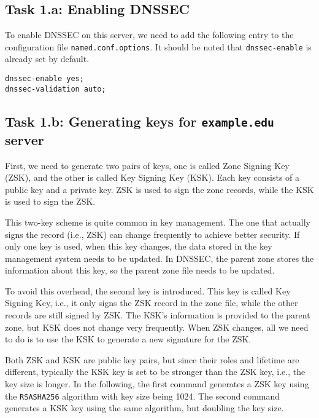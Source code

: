 \subsection{Task 1.a: Enabling DNSSEC}

To enable DNSSEC on this server, we need to add the following entry to the 
configuration file \texttt{named.conf.options}. 
It should be noted that \texttt{dnssec-enable} is already set by default. 

\begin{lstlisting}
dnssec-enable yes;
dnssec-validation auto;
\end{lstlisting}



\subsection{Task 1.b: Generating keys for \texttt{example.edu} server} 

First, we need to generate two pairs of keys, one is called Zone Signing Key (ZSK), and 
the other is called Key Signing Key (KSK). Each key consists of a public key and a private key.
ZSK is used to sign the zone records, while the KSK is used to sign the ZSK. 

This two-key scheme is quite common in key management. The one that actually signs the record
(i.e., ZSK) can change frequently to achieve better security. If only one key is used,
when this key changes, the data stored in the key management system needs to be updated. 
In DNSSEC, the parent zone stores the information about this key, so the parent zone file
needs to be updated. 

To avoid this overhead, the second key is introduced. This key is called 
Key Signing Key, i.e., it only signs the ZSK record in the zone file, while the 
other records are still signed by ZSK. The KSK's information is provided to 
the parent zone, but KSK does not change very frequently. When ZSK changes,
all we need to do is to use the KSK to generate a new signature for the ZSK. 

Both ZSK and KSK are public key pairs, but since their roles and lifetime are different,
typically the KSK key is set to be stronger than the ZSK key, i.e., the key size 
is longer. In the following, the first command generates a ZSK key using the 
\texttt{RSASHA256} algorithm with key size being 1024. The second command 
generates a KSK key using the same algorithm, but doubling the key size. 



